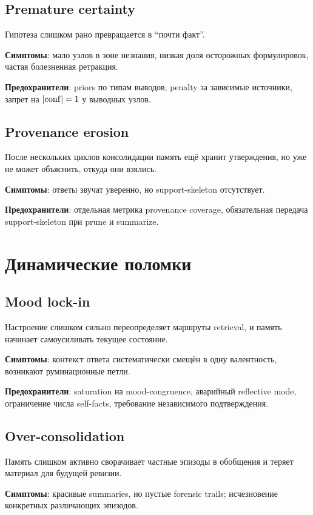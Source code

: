 \subsection*{Premature certainty}
Гипотеза слишком рано превращается в ``почти факт''.

\textbf{Симптомы}: мало узлов в зоне незнания, низкая доля осторожных формулировок,
частая болезненная ретракция.

\textbf{Предохранители}: priors по типам выводов, penalty за зависимые источники,
запрет на $|\mathrm{conf}|=1$ у выводных узлов.

\subsection*{Provenance erosion}
После нескольких циклов консолидации память ещё хранит утверждения, но уже не может
объяснить, откуда они взялись.

\textbf{Симптомы}: ответы звучат уверенно, но support-skeleton отсутствует.

\textbf{Предохранители}: отдельная метрика provenance coverage, обязательная
передача support-skeleton при prune и summarize.

\section{Динамические поломки}

\subsection*{Mood lock-in}
Настроение слишком сильно переопределяет маршруты retrieval, и память начинает
самоусиливать текущее состояние.

\textbf{Симптомы}: контекст ответа систематически смещён в одну валентность,
возникают руминационные петли.

\textbf{Предохранители}: saturation на mood-congruence, аварийный reflective mode,
ограничение числа self-facts, требование независимого подтверждения.

\subsection*{Over-consolidation}
Память слишком активно сворачивает частные эпизоды в обобщения и теряет материал
для будущей ревизии.

\textbf{Симптомы}: красивые summaries, но пустые forensic trails; исчезновение
конкретных различающих эпизодов.

